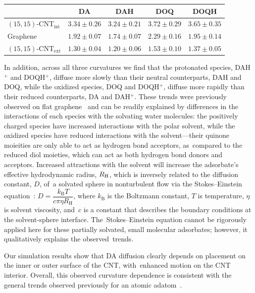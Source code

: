 \documentclass[molecules,article,accept,pdftex,moreauthors]{Definitions/mdpi}
\begin{document}
\begin{table}[H]
\begin{tabularx}{\textwidth}{m{3cm}CCCC}
        & \textbf{DA} & \textbf{DAH}\boldmath{$^+$} & \textbf{DOQ} & \textbf{DOQH}\boldmath{$^+$} \\
        \midrule
        $(15,15)$-CNT$_\mathrm{int}$ & $3.34    \pm 0.26$ & $3.24   \pm 0.21$   &   $3.72   \pm 0.29$   &   $3.65   \pm 0.35$ \\
        Graphene        & $1.92    \pm 0.07$ & $1.74   \pm 0.07$   &   $2.29   \pm 0.16$   &   $1.95   \pm 0.14$ \\
        $(15,15)$-CNT$_\mathrm{ext}$ & $1.30    \pm 0.04$ & $1.20   \pm 0.06$   &   $1.53   \pm 0.10$   &   $1.37   \pm 0.05$ \\
        \bottomrule
    \end{tabularx}
    \label{tab:Results_curvature_derivatives}
\end{table}

In addition, across all three curvatures we find that the protonated species, DAH$^+$ and DOQH$^+$, diffuse more slowly than their neutral counterparts, DAH and DOQ, while the oxidized species, DOQ and DOQH$^+$, diffuse more rapidly than their reduced counterparts, DA and DAH$^+$. These trends were previously observed on flat graphene~\cite{Jia2022} and can be readily explained by differences in the interactions of each species with the solvating water molecules: the positively charged species have increased interactions with the polar solvent, while the oxidized species have reduced interactions with the solvent---their quinone moieities are only able to act as hydrogen bond acceptors, as~compared to the reduced diol moieties, which can act as both hydrogen bond donors and acceptors. Increased attractions with the solvent will increase the adsorbate's effective hydrodynamic radius, $R_{\rm H}$, which is inversely related to the diffusion constant, $D$, of~a solvated sphere in nonturbulent flow via the Stokes--Einstein equation~\cite{nanofluidics}:
$D=\dfrac{k_\mathrm{B}T}{c\pi\eta R_\mathrm{H}}$, where $k_\mathrm{B}$ is the Boltzmann constant, $T$ is temperature, $\eta$ is solvent viscosity, and~$c$ is a constant that describes the boundary conditions at the solvent-sphere interface. The~Stokes--Einstein equation cannot be rigorously applied here for these partially solvated, small molecular adsorbates; however, it qualitatively explains the observed~trends. 

\newpage

Our simulation results show that DA diffusion clearly depends on placement on the inner or outer surface of the CNT, with~enhanced motion on the CNT interior. Overall, this observed curvature dependence is consistent with the general trends observed previously for an atomic adatom~\cite{Shu2001}. 
\end{document}
